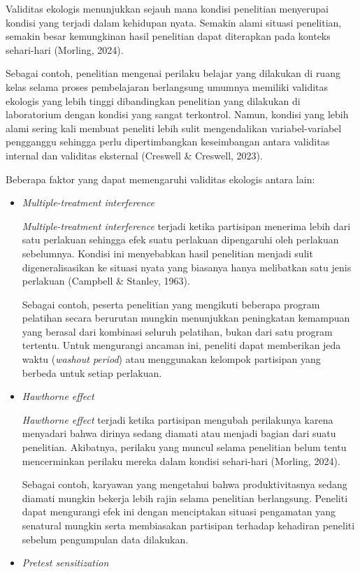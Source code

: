 \documentclass[
  indonesian,
  letterpaper,
  DIV=11,
  numbers=noendperiod]{scrreprt}
\begin{document}
\begin{enumerate}
  Validitas ekologis menunjukkan sejauh mana kondisi penelitian
  menyerupai kondisi yang terjadi dalam kehidupan nyata. Semakin alami
  situasi penelitian, semakin besar kemungkinan hasil penelitian dapat
  diterapkan pada konteks sehari-hari (Morling, 2024).

  Sebagai contoh, penelitian mengenai perilaku belajar yang dilakukan di
  ruang kelas selama proses pembelajaran berlangsung umumnya memiliki
  validitas ekologis yang lebih tinggi dibandingkan penelitian yang
  dilakukan di laboratorium dengan kondisi yang sangat terkontrol.
  Namun, kondisi yang lebih alami sering kali membuat peneliti lebih
  sulit mengendalikan variabel-variabel pengganggu sehingga perlu
  dipertimbangkan keseimbangan antara validitas internal dan validitas
  eksternal (Creswell \& Creswell, 2023).

  Beberapa faktor yang dapat memengaruhi validitas ekologis antara lain:

  \begin{itemize}
  \item
    \emph{Multiple-treatment interference}

    \emph{Multiple-treatment interference} terjadi ketika partisipan
    menerima lebih dari satu perlakuan sehingga efek suatu perlakuan
    dipengaruhi oleh perlakuan sebelumnya. Kondisi ini menyebabkan hasil
    penelitian menjadi sulit digeneralisasikan ke situasi nyata yang
    biasanya hanya melibatkan satu jenis perlakuan (Campbell \& Stanley,
    1963).

    Sebagai contoh, peserta penelitian yang mengikuti beberapa program
    pelatihan secara berurutan mungkin menunjukkan peningkatan kemampuan
    yang berasal dari kombinasi seluruh pelatihan, bukan dari satu
    program tertentu. Untuk mengurangi ancaman ini, peneliti dapat
    memberikan jeda waktu (\emph{washout period}) atau menggunakan
    kelompok partisipan yang berbeda untuk setiap perlakuan.
  \item
    \emph{Hawthorne effect}

    \emph{Hawthorne effect} terjadi ketika partisipan mengubah
    perilakunya karena menyadari bahwa dirinya sedang diamati atau
    menjadi bagian dari suatu penelitian. Akibatnya, perilaku yang
    muncul selama penelitian belum tentu mencerminkan perilaku mereka
    dalam kondisi sehari-hari (Morling, 2024).

    Sebagai contoh, karyawan yang mengetahui bahwa produktivitasnya
    sedang diamati mungkin bekerja lebih rajin selama penelitian
    berlangsung. Peneliti dapat mengurangi efek ini dengan menciptakan
    situasi pengamatan yang senatural mungkin serta membiasakan
    partisipan terhadap kehadiran peneliti sebelum pengumpulan data
    dilakukan.
  \item
    \emph{Pretest sensitization}


\end{itemize}
\end{enumerate}
\end{document}
